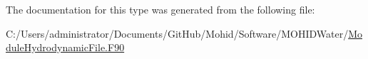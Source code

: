 The documentation for this type was generated from the following file\+:\begin{DoxyCompactItemize}
\item 
C\+:/\+Users/administrator/\+Documents/\+Git\+Hub/\+Mohid/\+Software/\+M\+O\+H\+I\+D\+Water/\mbox{\hyperlink{_module_hydrodynamic_file_8_f90}{Module\+Hydrodynamic\+File.\+F90}}\end{DoxyCompactItemize}
